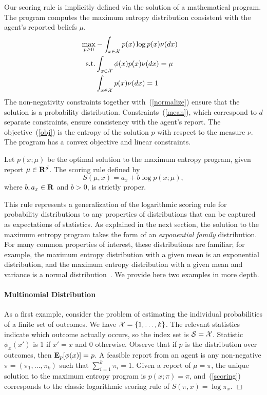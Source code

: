 Our scoring rule is implicitly defined via the solution of a mathematical program. The program computes the maximum entropy distribution consistent with the agent's reported beliefs $\mu$.
%
\begin{eqnarray}
\max_{p \geq 0} & \displaystyle - \int_{x \in \mathcal{X}} p(x) \log p(x) \nu(dx) & \label{obj} \\
\mbox{s.t.} & \displaystyle \int_{x \in \mathcal{X}} \phi(x) p(x) \nu(dx) = \mu & \label{mean} \\
 & \displaystyle \int_{x \in \mathcal{X}} p(x) \nu(dx) = 1 & \label{normalize}
\end{eqnarray}
%
The non-negativity constraints together with~(\ref{normalize}) ensure that the solution is a probability distribution. Constraints~(\ref{mean}), which correspond to $d$ separate constraints, ensure consistency with the agent's report. The objective~(\ref{obj}) is the entropy of the solution $p$ with respect to the measure $\nu$. The program has a convex objective and linear constraints. %
%
\begin{theorem} \label{thm:scoring}
Let $p(x;\mu)$ be the optimal solution to the maximum entropy program, given report $\mu \in \mathbf{R}^d$. The scoring rule defined by
%
\begin{equation} \label{scoring}
S(\mu,x) = a_x + b\log p(x;\mu),
\end{equation}
%
where $b,a_x \in \mathbf{R}$ and $b > 0$, is strictly proper.
\end{theorem}
%
\noindent
This rule represents a generalization of the logarithmic scoring rule for probability distributions to any properties of distributions that can be captured as expectations of statistics.  As explained in the next section, the solution to the maximum entropy program takes the form of an \emph{exponential family} distribution. For many common properties of interest, these distributions are familiar; for example, the maximum entropy distribution with a given mean is an exponential distribution, and the maximum entropy distribution with a given mean and variance is a normal distribution~\cite{}. We provide here two examples in more depth. 


\paragraph{Multinomial Distribution}

As a first example, consider the problem of estimating the individual probabilities of a finite set of outcomes. We have $\mathcal{X} = \{1,\ldots,k\}$. The relevant statistics indicate which outcome actually occurs, so the index set is $\mathcal{S} = \mathcal{X}$. Statistic $\phi_x(x')$ is 1 if $x' = x$ and 0 otherwise. Observe that if $p$ is the distribution over outcomes, then $\mathbf{E}_p[\phi(x)] = p$. A feasible report from an agent is any non-negative $\pi = (\pi_1,\ldots,\pi_k)$ such that $\sum_{i=1}^k \pi_i = 1$. Given a report of $\mu = \pi$, the unique solution to the maximum entropy program is $p(x; \pi) = \pi$, and~(\ref{scoring}) corresponds to the classic logarithmic scoring rule of $S(\pi,x) = \log \pi_x$. \hfill{$\Box$}


